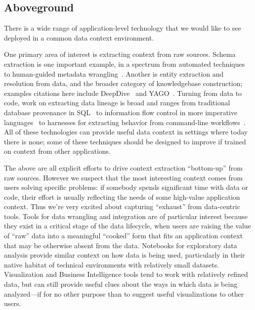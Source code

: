 \documentclass{cidr-2017}
\begin{document}
\subsection{Aboveground}
There is a wide range of application-level technology that we would like to see deployed in a common data context environment. 

One primary area of interest is extracting context from raw sources. Schema extraction is one important example, in a spectrum from automated techniques~\cite{webtables,adelfio2013schema} to human-guided metadata wrangling~\cite{wrangler,flashextract}. Another is entity extraction and resolution from data, and the broader category of knowledgebase construction; examples citations here include DeepDive~\cite{deepdive} and YAGO~\cite{yago}. Turning from data to code, work on extracting data lineage is broad and ranges from traditional database provenance in SQL~\cite{cheney2009provenance} to information flow control in more imperative languages~\cite{myers1999jflow} to harnesses for extracting behavior from command-line workflows~\cite{burrito,reprozip}. All of these technologies can provide useful data context in settings where today there is none; some of these techniques should be designed to improve if trained on context from other applications.

The above are all explicit efforts to drive context extraction ``bottom-up'' from raw sources. However we suspect that the most interesting context comes from users solving specific problems: if somebody spends significant time with data or code, their effort is usually reflecting the needs of some high-value application context. Thus we're very excited about capturing ``exhaust'' from data-centric tools. Tools for data wrangling and integration are of particular interest because they exist in a critical stage of the data lifecycle, when users are raising the value of ``raw'' data into a meaningful ``cooked'' form that fits an application context that may be otherwise absent from the data. Notebooks for exploratory data analysis provide similar context on how data is being used, particularly in their native habitat of technical environments with relatively small datasets. Visualization and Business Intelligence tools tend to work with relatively refined data, but can still provide useful clues about the ways in which data is being analyzed---if for no other purpose than to suggest useful visualizations to other users. 
\end{document}
